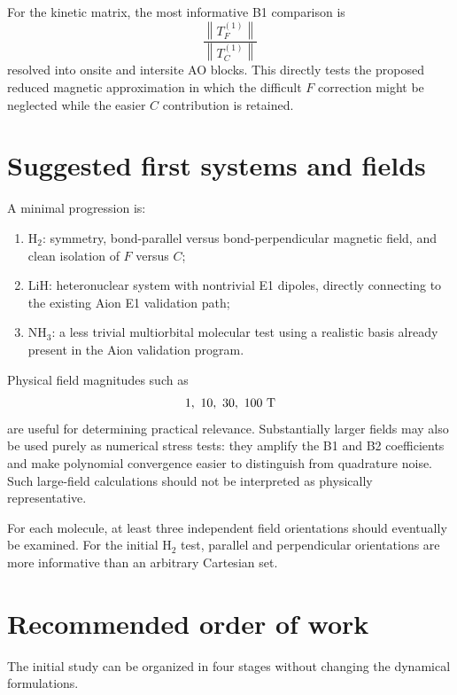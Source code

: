 \documentclass[11pt]{article}
\newcommand{\norm}[1]{\left\lVert #1\right\rVert}
\begin{document}
For the kinetic matrix, the most informative B1 comparison is
\begin{equation}
\boxed{
\frac{\norm{T_F^{(1)}}}{\norm{T_C^{(1)}}}
}
\end{equation}
resolved into onsite and intersite AO blocks.  This directly tests the proposed reduced magnetic approximation in which the difficult $F$ correction might be neglected while the easier $C$ contribution is retained.

\section{Suggested first systems and fields}

A minimal progression is:
\begin{enumerate}[leftmargin=*]
\item H$_2$: symmetry, bond-parallel versus bond-perpendicular magnetic field, and clean isolation of $F$ versus $C$;
\item LiH: heteronuclear system with nontrivial E1 dipoles, directly connecting to the existing Aion E1 validation path;
\item NH$_3$: a less trivial multiorbital molecular test using a realistic basis already present in the Aion validation program.
\end{enumerate}

Physical field magnitudes such as
\begin{equation}
1,\ 10,\ 30,\ 100\ {\rm T}
\end{equation}
are useful for determining practical relevance.  Substantially larger fields may also be used purely as numerical stress tests: they amplify the B1 and B2 coefficients and make polynomial convergence easier to distinguish from quadrature noise.  Such large-field calculations should not be interpreted as physically representative.

For each molecule, at least three independent field orientations should eventually be examined.  For the initial H$_2$ test, parallel and perpendicular orientations are more informative than an arbitrary Cartesian set.

\section{Recommended order of work}

The initial study can be organized in four stages without changing the dynamical formulations.
\end{document}

